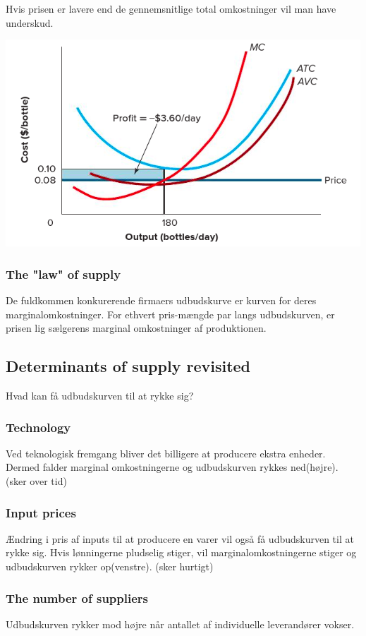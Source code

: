 Hvis prisen er lavere end de gennemsnitlige total omkostninger vil man have underskud.

\includegraphics[scale=0.8]{Afsnit/Lektion2/Underskud.png}

\subsubsection{The "law" of supply}
De fuldkommen konkurerende firmaers udbudskurve er kurven for deres marginalomkostninger. For ethvert pris-mængde par langs udbudskurven, er prisen lig sælgerens marginal omkostninger af produktionen. 

\subsection{Determinants of supply revisited}
Hvad kan få udbudskurven til at rykke sig?
\subsubsection{Technology}
Ved teknologisk fremgang bliver det billigere at producere ekstra enheder. Dermed falder marginal omkostningerne og udbudskurven rykkes ned(højre). (sker over tid)
\subsubsection{Input prices}
Ændring i pris af inputs til at producere en varer vil også få udbudskurven til at rykke sig. Hvis lønningerne pludselig stiger, vil marginalomkostningerne stiger og udbudskurven rykker op(venstre). (sker hurtigt)
\subsubsection{The number of suppliers}
Udbudskurven rykker mod højre når antallet af individuelle leverandører vokser. 
